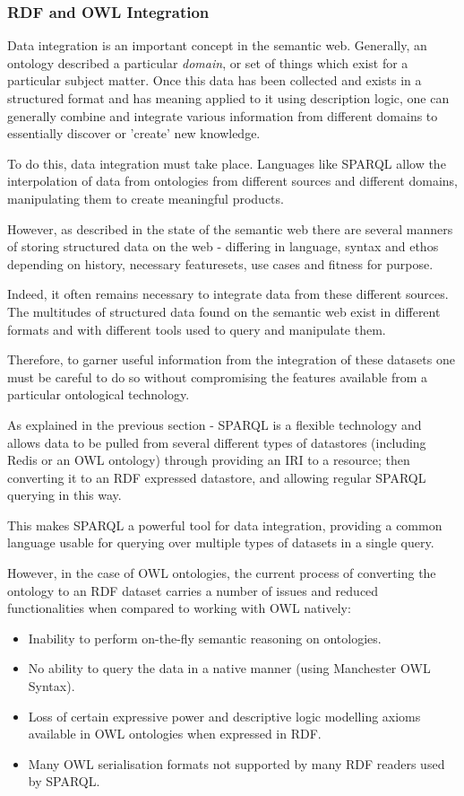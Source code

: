 \documentclass{article}
\begin{document}
\subsubsection{RDF and OWL Integration}

Data integration is an important concept in the semantic web. Generally, an
ontology described a particular \emph{domain}, or set of things which exist for
a particular subject matter. Once this data has been collected and exists in a
structured format and has meaning applied to it using description logic, one can
generally combine and integrate various information from different domains to
essentially discover or 'create' new knowledge.

To do this, data integration must take place. Languages like SPARQL allow the
interpolation of data from ontologies from different sources and different
domains, manipulating them to create meaningful products. 

However, as described in the state of the semantic web there are several manners
of storing structured data on the web - differing in language, syntax and ethos
depending on history, necessary featuresets, use cases and fitness for purpose.

Indeed, it often remains necessary to integrate data from these different
sources. The multitudes of structured data found on the semantic web exist in different
formats and with different tools used to query and manipulate them.

Therefore, to garner useful information from the integration of these datasets
one must be careful to do so without compromising the features available from a
particular ontological technology.

As explained in the previous section - SPARQL is a flexible technology and allows 
data to be pulled from several different types of datastores (including Redis or an 
OWL ontology) through providing an IRI to a resource; then converting it to an RDF 
expressed datastore, and allowing regular SPARQL querying in this
way.\cite{sparqlandowl}

This makes SPARQL a powerful tool for data integration, providing a common
language usable for querying over multiple types of datasets in a single query.

However, in the case of OWL ontologies, the current process of converting the
ontology to an RDF dataset carries a number of issues and reduced
functionalities when compared to working with OWL natively:

\begin{itemize}
  \item Inability to perform on-the-fly semantic reasoning on ontologies.
  \item No ability to query the data in a native manner (using Manchester OWL Syntax).
  \item Loss of certain expressive power and descriptive logic modelling axioms available in OWL
  ontologies when expressed in RDF.
  \item Many OWL serialisation formats not supported by many RDF readers used by
  SPARQL.
\end{itemize}
\end{document}
